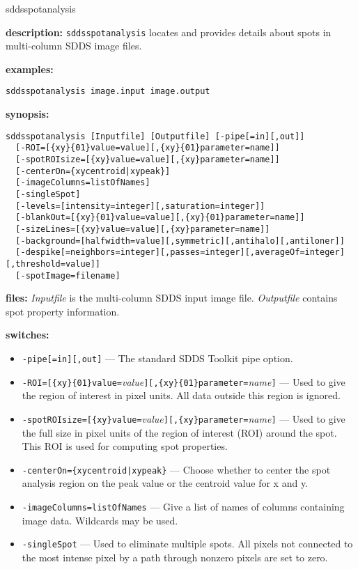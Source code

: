 %
\begin{sddsprog}{sddsspotanalysis}
  \item \textbf{description:} \verb|sddsspotanalysis| locates and provides details about spots in multi-column SDDS image files.
  \item \textbf{examples:}
    \begin{verbatim}
sddsspotanalysis image.input image.output
    \end{verbatim}
  \item \textbf{synopsis:}
    \begin{verbatim}
sddsspotanalysis [Inputfile] [Outputfile] [-pipe[=in][,out]]
  [-ROI=[{xy}{01}value=value][,{xy}{01}parameter=name]]
  [-spotROIsize=[{xy}value=value][,{xy}parameter=name]]
  [-centerOn={xycentroid|xypeak}]
  [-imageColumns=listOfNames]
  [-singleSpot]
  [-levels=[intensity=integer][,saturation=integer]]
  [-blankOut=[{xy}{01}value=value][,{xy}{01}parameter=name]]
  [-sizeLines=[{xy}value=value][,{xy}parameter=name]]
  [-background=[halfwidth=value][,symmetric][,antihalo][,antiloner]]
  [-despike[=neighbors=integer][,passes=integer][,averageOf=integer][,threshold=value]]
  [-spotImage=filename]
    \end{verbatim}
  \item \textbf{files:}
    \emph{Inputfile} is the multi-column SDDS input image file.
    \emph{Outputfile} contains spot property information.
  \item \textbf{switches:}
    \begin{itemize}
      \item \verb|-pipe[=in][,out]| --- The standard SDDS Toolkit pipe option.
      \item \verb|-ROI=[{xy}{01}value=|{\em value}\verb|][,{xy}{01}parameter=|{\em name}\verb|]| --- Used to give the region of interest in pixel units. All data outside this region is ignored.
      \item \verb|-spotROIsize=[{xy}value=|{\em value}\verb|][,{xy}parameter=|{\em name}\verb|]| --- Used to give the full size in pixel units of the region of interest (ROI) around the spot. This ROI is used for computing spot properties.
      \item \verb!-centerOn={xycentroid|xypeak}! --- Choose whether to center the spot analysis region on the peak value or the centroid value for x and y.
      \item \verb|-imageColumns=listOfNames| --- Give a list of names of columns containing image data. Wildcards may be used.
      \item \verb|-singleSpot| --- Used to eliminate multiple spots. All pixels not connected to the most intense pixel by a path through nonzero pixels are set to zero.

\end{itemize}
\end{sddsprog}
